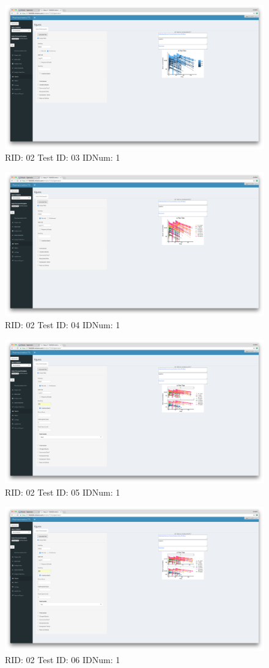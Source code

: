 \begin{figure}[H]
\includegraphics[width=.8\textwidth]{screencaps/02-03-1.png}
\caption{RID: 02 Test ID: 03 IDNum: 1}
\end{figure}
\begin{figure}[H]
\includegraphics[width=.8\textwidth]{screencaps/02-04-1.png}
\caption{RID: 02 Test ID: 04 IDNum: 1}
\end{figure}
\begin{figure}[H]
\includegraphics[width=.8\textwidth]{screencaps/02-05-1.png}
\caption{RID: 02 Test ID: 05 IDNum: 1}
\end{figure}
\begin{figure}[H]
\includegraphics[width=.8\textwidth]{screencaps/02-06-1.png}
\caption{RID: 02 Test ID: 06 IDNum: 1}
\end{figure}
